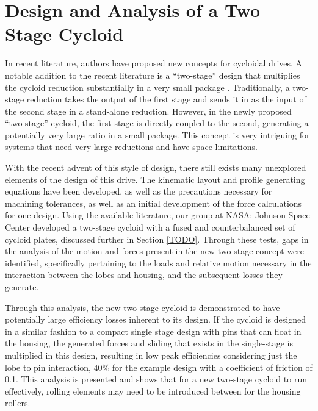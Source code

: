 
\chapter{Design and Analysis of a Two Stage Cycloid}\label{ch:dual}

In recent literature, authors have proposed new concepts for cycloidal drives. A notable addition to the recent literature is a ``two-stage'' design that multiplies the cycloid reduction substantially in a very small package \cite{ref:new_two_stage}. Traditionally, a two-stage reduction takes the output of the first stage and sends it in as the input of the second stage in a stand-alone reduction. However, in the newly proposed ``two-stage'' cycloid, the first stage is directly coupled to the second, generating a potentially very large ratio in a small package. This concept is very intriguing for systems that need very large reductions and have space limitations. 

With the recent advent of this style of design, there still exists many unexplored elements of the design of this drive. The kinematic layout and profile generating equations have been developed, as well as the precautions necessary for machining tolerances, as well as an initial development of the force calculations for one design. Using the available literature, our group at NASA: Johnson Space Center developed a two-stage cycloid with a fused and counterbalanced set of cycloid plates, discussed further in Section \ref{TODO}. Through these tests, gaps in the analysis of the motion and forces present in the new two-stage concept were identified, specifically pertaining to the loads and relative motion necessary in the interaction between the lobes and housing, and the subsequent losses they generate. 

Through this analysis, the new two-stage cycloid is demonstrated to have potentially large efficiency losses inherent to its design. If the cycloid is designed in a similar fashion to a compact single stage design with pins that can float in the housing, the generated forces and sliding that exists in the single-stage is multiplied in this design, resulting in low peak efficiencies considering just the lobe to pin interaction, 40\% for the example design with a coefficient of friction of 0.1. This analysis is presented and shows that for a new two-stage cycloid to run effectively, rolling elements may need to be introduced between for the housing rollers. 

